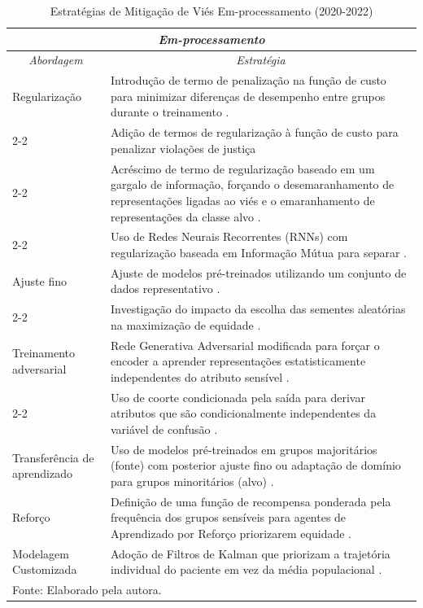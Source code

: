 \begin{longtable}{p{2.5cm}|p{11.5cm}}%
\caption{Estratégias de Mitigação de Viés Em-processamento (2020-2022)} \label{tab:mitigacao_in} \\
\hline
\multicolumn{2}{c}{\textit{Em-processamento}} \\ \hline
\hline
\multicolumn{1}{c|}{\textit{Abordagem}} & \multicolumn{1}{c}{\textit{Estratégia}} %
\\ \hline
Regularização &
Introdução de termo de penalização na função de custo para minimizar diferenças de desempenho entre grupos durante o treinamento \cite{alday2022age}. \\
\cline{2-2}
& Adição de termos de regularização à função de custo para penalizar violações de justiça \cite{pfohl2021empirical} \\
\cline{2-2}
& Acréscimo de termo de regularização baseado em um gargalo de informação, forçando o desemaranhamento de representações ligadas ao viés e o emaranhamento de representações da classe alvo \cite{tartaglione2021end}. \\
\cline{2-2}
& Uso de Redes Neurais Recorrentes (RNNs) com regularização baseada em Informação Mútua para separar %
\cite{chu2022disentangled}. \\
\hline
Ajuste fino & Ajuste de modelos pré-treinados utilizando um conjunto de dados representativo \cite{daneshjou2022disparities}. \\
\cline{2-2}
& Investigação do impacto da escolha das sementes aleatórias na maximização de equidade \cite{amir2021impact}. \\
\hline
Treinamento adversarial & Rede Generativa Adversarial modificada para forçar o encoder a aprender representações estatisticamente independentes do atributo sensível \cite{adeli2021representation}. \\
\cline{2-2}
& Uso de coorte condicionada pela saída para derivar atributos que são condicionalmente independentes da variável de confusão \cite{zhao2020training}. \\
\hline
Transferência de aprendizado & Uso de modelos pré-treinados em grupos majoritários (fonte) com posterior ajuste fino ou adaptação de domínio para grupos minoritários (alvo) \cite{gao2020deep}. \\
\hline
Reforço &
Definição de uma função de recompensa ponderada pela frequência dos grupos sensíveis para agentes de Aprendizado por Reforço priorizarem equidade
\cite{yang2022algorithmic}.
\\ \hline
Modelagem Customizada &
Adoção de Filtros de Kalman que priorizam a trajetória individual do paciente em vez da média populacional \cite{zhalechian2022augmenting}. \\
\hline
\multicolumn{2}{l}{\small Fonte: Elaborado pela autora.} \\ %
\end{longtable}

